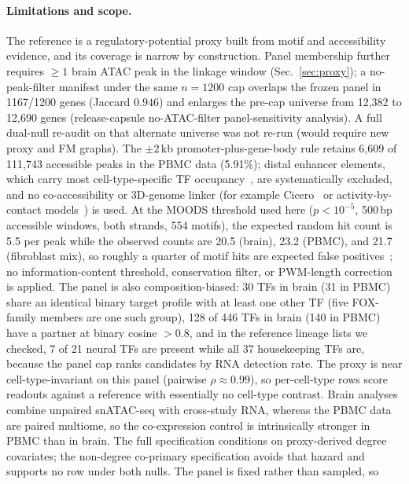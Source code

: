 \documentclass[fleqn,10pt,lineno]{wlpeerj}
\begin{document}
\paragraph{Limitations and scope.}
The reference is a regulatory-potential proxy built from motif and accessibility evidence, and its
coverage is narrow by construction. Panel membership further requires $\ge1$ brain ATAC peak in the
linkage window (Sec.~\ref{sec:proxy}); a no-peak-filter manifest under the same $n=1200$ cap
overlaps the frozen panel in 1167/1200 genes (Jaccard $0.946$) and enlarges the pre-cap universe
from 12{,}382 to 12{,}690 genes
(release-capsule no-ATAC-filter panel-sensitivity analysis). A full dual-null re-audit
on that alternate universe was not re-run (would require new proxy and FM graphs). The $\pm2$\,kb
promoter-plus-gene-body rule retains 6{,}609 of
111{,}743 accessible peaks in the PBMC data (5.91\%); distal enhancer elements, which carry most
cell-type-specific TF occupancy~\citep{thurman2012accessible}, are systematically excluded, and no co-accessibility or
3D-genome linker (for example Cicero~\citep{pliner2018cicero} or activity-by-contact models~\citep{fulco2019activity}) is used. At the MOODS
threshold used here ($p<10^{-5}$, 500\,bp accessible windows, both strands, 554 motifs), the
expected random hit count is 5.5 per peak while the observed counts are 20.5 (brain), 23.2
(PBMC), and 21.7 (fibroblast mix), so roughly a quarter of motif hits are expected false positives~\citep{wasserman2004applied};
no information-content threshold, conservation filter, or PWM-length correction~\citep{stormo2000dna} is applied. The
panel is also composition-biased: 30 TFs in brain (31 in PBMC) share an identical binary target
profile with at least one other TF (five FOX-family members are one such group), 128 of 446 TFs
in brain (140 in PBMC) have a partner at binary cosine $>0.8$, and in the reference lineage lists
we checked, 7 of 21 neural TFs are present while
all 37 housekeeping TFs are, because the panel cap ranks candidates by RNA detection rate. The
proxy is near cell-type-invariant on this panel (pairwise $\rho\approx0.99$), so per-cell-type rows
score readouts against a reference with essentially no cell-type contrast. Brain analyses combine
unpaired snATAC-seq with cross-study RNA, whereas the PBMC data are paired multiome, so the
co-expression control is intrinsically stronger in PBMC than in brain. The full specification
conditions on proxy-derived degree covariates; the non-degree co-primary specification avoids
that hazard and supports no row under both nulls. The panel is fixed rather than sampled, so
\end{document}
